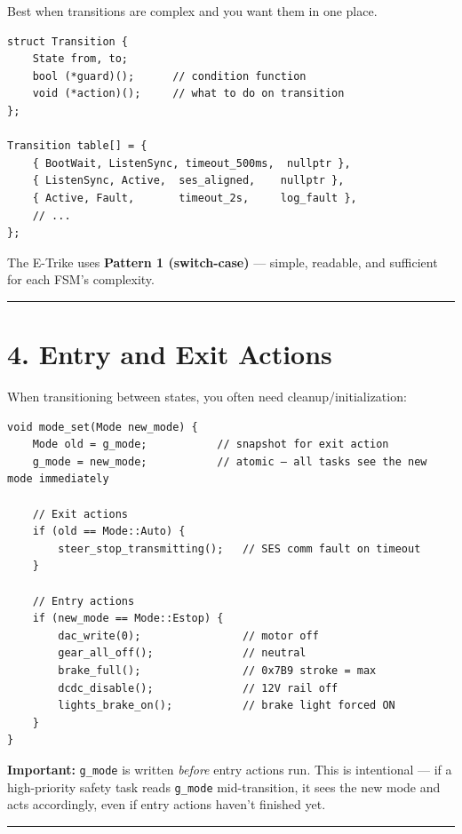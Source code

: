 \documentclass[12pt,a4paper,oneside]{report}
\begin{document}
Best when transitions are complex and you want them in one place.

\begin{verbatim}
struct Transition {
    State from, to;
    bool (*guard)();      // condition function
    void (*action)();     // what to do on transition
};

Transition table[] = {
    { BootWait, ListenSync, timeout_500ms,  nullptr },
    { ListenSync, Active,  ses_aligned,    nullptr },
    { Active, Fault,       timeout_2s,     log_fault },
    // ...
};
\end{verbatim}

The E-Trike uses \textbf{Pattern 1 (switch-case)} --- simple, readable, and
sufficient for each FSM's complexity.

\begin{center}\rule{0.5\linewidth}{0.5pt}\end{center}

\section{4. Entry and Exit Actions}\label{entry-and-exit-actions}

When transitioning between states, you often need cleanup/initialization:

\begin{verbatim}
void mode_set(Mode new_mode) {
    Mode old = g_mode;           // snapshot for exit action
    g_mode = new_mode;           // atomic — all tasks see the new mode immediately

    // Exit actions
    if (old == Mode::Auto) {
        steer_stop_transmitting();   // SES comm fault on timeout
    }

    // Entry actions
    if (new_mode == Mode::Estop) {
        dac_write(0);                // motor off
        gear_all_off();              // neutral
        brake_full();                // 0x7B9 stroke = max
        dcdc_disable();              // 12V rail off
        lights_brake_on();           // brake light forced ON
    }
}
\end{verbatim}

\textbf{Important:} \texttt{g\_mode} is written \emph{before} entry actions run.
This is intentional --- if a high-priority safety task reads \texttt{g\_mode}
mid-transition, it sees the new mode and acts accordingly, even if entry actions
haven't finished yet.

\begin{center}\rule{0.5\linewidth}{0.5pt}\end{center}
\end{document}

